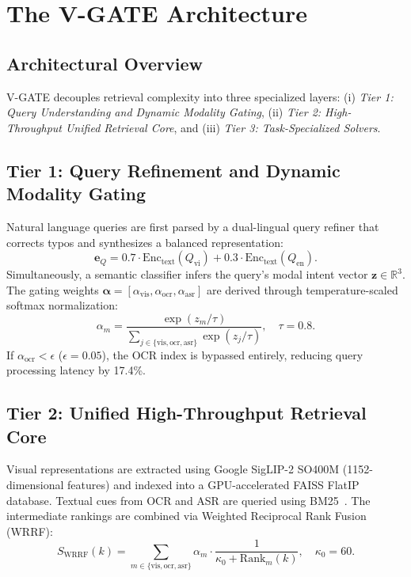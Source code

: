 \documentclass[runningheads]{llncs}
\begin{document}
\section{The V-GATE Architecture}
\label{sec:architecture}

\subsection{Architectural Overview}
V-GATE decouples retrieval complexity into three specialized layers: (i) \textit{Tier 1: Query Understanding and Dynamic Modality Gating}, (ii) \textit{Tier 2: High-Throughput Unified Retrieval Core}, and (iii) \textit{Tier 3: Task-Specialized Solvers}. 

\subsection{Tier 1: Query Refinement and Dynamic Modality Gating}
Natural language queries are first parsed by a dual-lingual query refiner that corrects typos and synthesizes a balanced representation:
\begin{equation}
    \mathbf{e}_Q = 0.7 \cdot \text{Enc}_{\text{text}}(Q_{\text{vi}}) + 0.3 \cdot \text{Enc}_{\text{text}}(Q_{\text{en}}).
\end{equation}
Simultaneously, a semantic classifier infers the query's modal intent vector $\mathbf{z} \in \mathbb{R}^3$. The gating weights $\boldsymbol{\alpha} = [\alpha_{\text{vis}}, \alpha_{\text{ocr}}, \alpha_{\text{asr}}]$ are derived through temperature-scaled softmax normalization:
\begin{equation}
    \alpha_m = \frac{\exp(z_m / \tau)}{\sum_{j \in \{\text{vis}, \text{ocr}, \text{asr}\}} \exp(z_j / \tau)}, \quad \tau = 0.8.
\end{equation}
If $\alpha_{\text{ocr}} < \epsilon$ ($\epsilon = 0.05$), the OCR index is bypassed entirely, reducing query processing latency by 17.4\%.

\subsection{Tier 2: Unified High-Throughput Retrieval Core}
Visual representations are extracted using Google SigLIP-2 SO400M (1152-dimensional features) and indexed into a GPU-accelerated FAISS FlatIP database. Textual cues from OCR and ASR are queried using BM25~\cite{robertson2009probabilistic}. The intermediate rankings are combined via Weighted Reciprocal Rank Fusion (WRRF):
\begin{equation}
    S_{\text{WRRF}}(k) = \sum_{m \in \{\text{vis}, \text{ocr}, \text{asr}\}} \alpha_m \cdot \frac{1}{\kappa_0 + \text{Rank}_m(k)}, \quad \kappa_0 = 60.
\end{equation}
\end{document}
